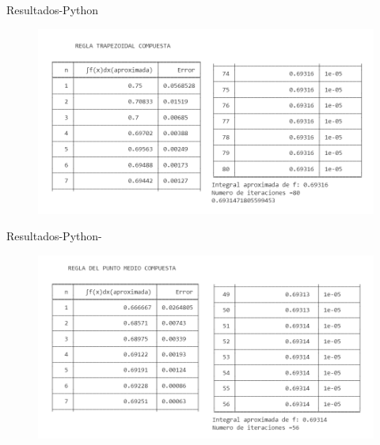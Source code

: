 \begin{frame}{Resultados-Python}
    \begin{figure}
        \centering
        \includegraphics[width=12cm]{p9-trap.png}
        \label{fig:enter-label}
    \end{figure}
\end{frame}

\begin{frame}{Resultados-Python-}
    \begin{figure}
        \centering
        \includegraphics[width=12cm]{p9-pmedio.png}
        \label{fig:enter-label}
    \end{figure}
\end{frame}
